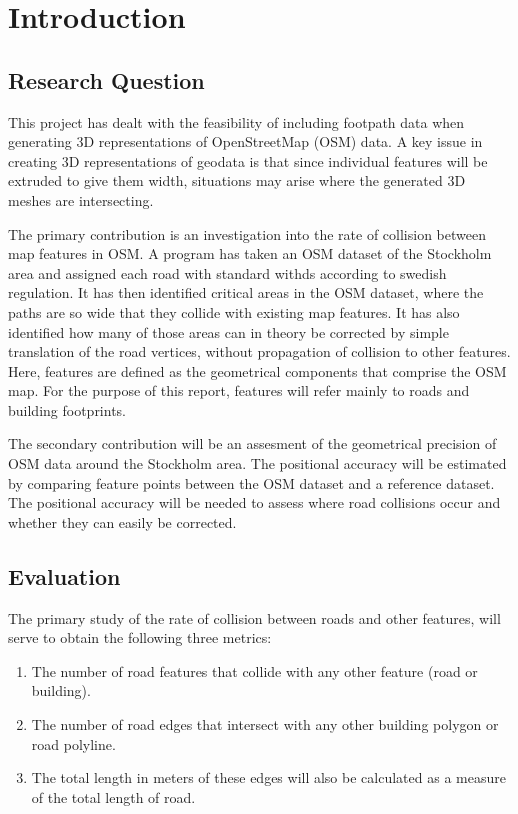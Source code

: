 \documentclass[a4paper]{article}
\begin{document}
\section{Introduction}

\subsection{Research Question}

This project has dealt with the feasibility of including footpath data when generating 3D representations of OpenStreetMap (OSM) data.
A key issue in creating 3D representations of geodata is that since individual features will be extruded to give them width, situations may arise where the generated 3D meshes are intersecting.

The primary contribution is an investigation into the rate of collision between map features in OSM.
A program has taken an OSM dataset of the Stockholm area and assigned each road with standard withds according to swedish regulation.
It has then identified critical areas in the OSM dataset, where the paths are so wide that they collide with existing map features.
It has also identified how many of those areas can in theory be corrected by simple translation of the road vertices, without propagation of collision to other features.
Here, features are defined as the geometrical components that comprise the OSM map.
For the purpose of this report, features will refer mainly to roads and building footprints.

The secondary contribution will be an assesment of the geometrical precision of OSM data around the Stockholm area.
The positional accuracy will be estimated by comparing feature points between the OSM dataset and a reference dataset.
The positional accuracy will be needed to assess where road collisions occur and whether they can easily be corrected.

\subsection{Evaluation}

The primary study of the rate of collision between roads and other features, will serve to obtain the following three metrics:

\begin{enumerate}
    \item The number of road features that collide with any other feature (road or building).
    \item The number of road edges that intersect with any other building polygon or road polyline.
    \item The total length in meters of these edges will also be calculated as a measure of the total length of road.
\end{enumerate}
\end{document}
